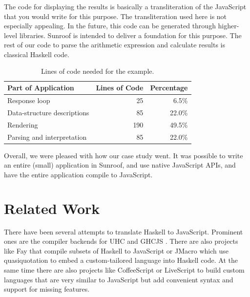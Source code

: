 \documentclass{llncs}
\begin{document}
The code for displaying the results is basically a 
transliteration of the JavaScript that you would write for this 
purpose.
The transliteration used here is not especially appealing. 
In the future, this code can be generated through higher-level 
libraries. Sunroof is intended to deliver a foundation for
this purpose.
The rest of our code to parse the arithmetic expression and calculate 
results is classical Haskell code. 

\begin{table}[t]
\begin{center}
\vspace{0.1in}
\begin{tabular}{l@{\quad}r@{\quad}r}
\hline\rule{0pt}{12pt}%
Part of Application & Lines of Code & Percentage \\[2pt]
\hline\rule{0pt}{12pt}%
Response loop & 25 & 6.5\% \\[2pt]
Data-structure descriptions & 85 & 22.0\% \\[2pt]
Rendering & 190 & 49.5\% \\[2pt]
Parsing and interpretation & 85 & 22.0\% \\[2pt]
\hline
\end{tabular}
\end{center}
\caption{Lines of code needed for the example.}
\label{tab:example-statistics}
\vspace{-0.5cm}
\end{table} 

Overall, we were pleased with how our case study went.
It was possible to write an entire (small) application
in Sunroof, and use native JavaScript APIs, and have
the entire application compile to JavaScript. 

\section{Related Work}

There have been several attempts to translate Haskell to JavaScript.
Prominent ones are the compiler backends for 
UHC \cite{Stutterheim:12:ImprovingUHCJavaScriptBackend} and 
GHCJS \cite{project:ghcjs}. There are also projects like Fay \cite{project:fay} 
that compile subsets of Haskell to JavaScript or JMacro \cite{project:jmacro}
which use quasiquotation \cite{Mainland:07:QuasiquotingHaskell} to embed 
a custom-tailored language into Haskell code.
%
At the same time there are also projects like 
CoffeeScript \cite{project:coffeescript} or LiveScript \cite{project:livescript}
to build custom languages 
that are very similar to JavaScript but add convenient syntax and
support for missing features.
\end{document}
